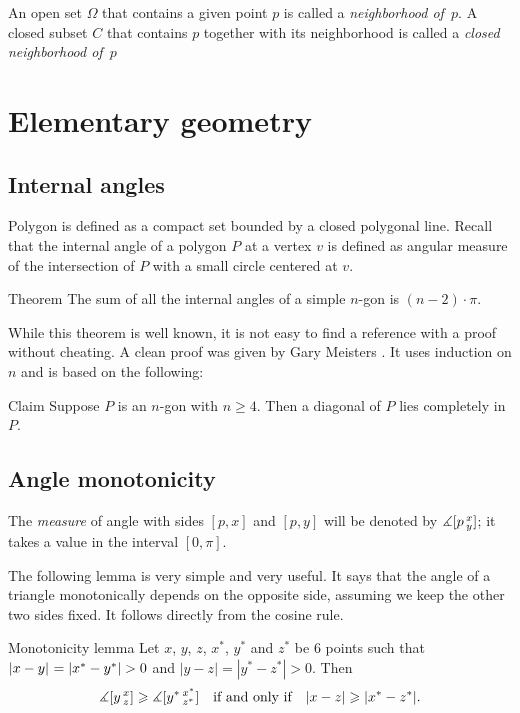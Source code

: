An open set $\Omega$ that contains a given point $p$ is called a \emph{neighborhood of~$p$}.
A closed subset $C$ that contains $p$ together with its neighborhood is called a {}\emph{closed neighborhood of~$p$}

\section{Elementary geometry}

\subsection*{Internal angles}

Polygon is defined as a compact set bounded by a closed polygonal line. 
Recall that the internal angle of a polygon $P$ at a vertex $v$
is defined as angular measure of the intersection of $P$ with a small circle centered at $v$.

\begin{thm}{Theorem}\label{thm:sum=(n-2)pi}
The sum of all the internal angles of a simple $n$-gon is $(n-2)\cdot\pi$. 
\end{thm}

While this theorem is well known, it is not easy to find a reference with a proof without cheating.
A clean proof was given by Gary Meisters \cite{meisters}.
It uses induction on $n$ and is based on the following:

\begin{thm}{Claim}
Suppose $P$ is an $n$-gon with $n\ge 4$.
Then a diagonal of $P$ lies completely in $P$.
\end{thm}



\subsection*{Angle monotonicity}

The {}\emph{measure} of angle with sides $[p,x]$ and $[p,y]$ will be denoted by $\measuredangle[p\,{}^{x}_{y}]$;
it takes a value in the interval $[0,\pi]$.

The following lemma is very simple and very useful.
It says that the angle of a triangle monotonically depends on the opposite side, assuming we keep the other two sides fixed.
It follows directly from the cosine rule.

\begin{thm}{Monotonicity lemma}\label{lem:angle-monotonicity}
Let $x$, $y$, $z$, $x^{*}$, $y^{*}$ and $z^{*}$ be 6 points such that $\dist{x}{y}{}\z=|x^{*}-y^{*}|>0$ and $|y-z|=|y^{*}-z^{*}|>0$.
Then 
\[\measuredangle[y\,{}^{x}_{z}]
\geqslant
\measuredangle[y^{*}\,{}^{x^{*}}_{z^{*}}]
\quad\text{if and only if}\quad
|x-z|\geqslant |x^{*}-z^{*}|.\]
\end{thm}

